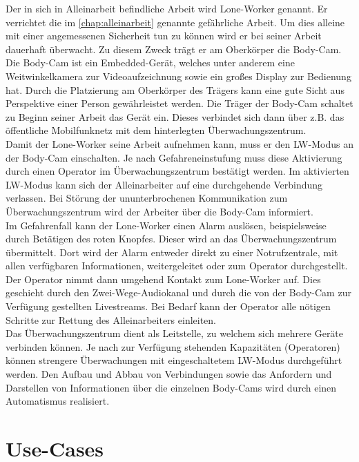 \documentclass[thesis.tex]{subfiles}
\begin{document}
Der in sich in Alleinarbeit befindliche Arbeit wird Lone-Worker genannt.
Er verrichtet die im \autoref{chap:alleinarbeit} genannte gefährliche Arbeit.
Um dies alleine mit einer angemessenen Sicherheit tun zu können wird er bei seiner Arbeit dauerhaft überwacht.
Zu diesem Zweck trägt er am Oberkörper die Body-Cam.
Die Body-Cam ist ein Embedded-Gerät, welches unter anderem eine Weitwinkelkamera zur Videoaufzeichnung sowie ein großes Display zur Bedienung hat.
Durch die Platzierung am Oberkörper des Trägers kann eine gute Sicht aus Perspektive einer Person gewährleistet werden.
Die Träger der Body-Cam schaltet zu Beginn seiner Arbeit das Gerät ein.
Dieses verbindet sich dann über z.B. das öffentliche Mobilfunknetz mit dem hinterlegten Überwachungszentrum.
\\

Damit der Lone-Worker seine Arbeit aufnehmen kann, muss er den LW-Modus an der Body-Cam einschalten.
Je nach Gefahreneinstufung muss diese Aktivierung durch einen Operator im Überwachungszentrum bestätigt werden.
Im aktivierten LW-Modus kann sich der Alleinarbeiter auf eine durchgehende Verbindung verlassen.
Bei Störung der ununterbrochenen Kommunikation zum Überwachungszentrum wird der Arbeiter über die Body-Cam informiert.
\\

Im Gefahrenfall kann der Lone-Worker einen Alarm auslösen, beispielsweise durch Betätigen des roten Knopfes.
Dieser wird an das Überwachungszentrum übermittelt.
Dort wird der Alarm entweder direkt zu einer Notrufzentrale, mit allen verfügbaren Informationen, weitergeleitet oder zum Operator durchgestellt.
Der Operator nimmt dann umgehend Kontakt zum Lone-Worker auf.
Dies geschieht durch den Zwei-Wege-Audiokanal und durch die von der Body-Cam zur Verfügung gestellten Livestreams.
Bei Bedarf kann der Operator alle nötigen Schritte zur Rettung des Alleinarbeiters einleiten.
\\

Das Überwachungszentrum dient als Leitstelle, zu welchem sich mehrere Geräte verbinden können.
Je nach zur Verfügung stehenden Kapazitäten (Operatoren) können strengere Überwachungen mit eingeschaltetem LW-Modus durchgeführt werden.
Den Aufbau und Abbau von Verbindungen sowie das Anfordern und Darstellen von Informationen über die einzelnen Body-Cams wird
durch einen Automatismus realisiert.
\\

\section{Use-Cases}
\end{document}
